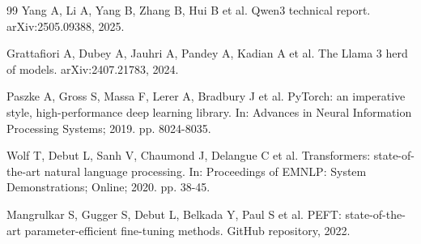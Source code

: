 \documentclass{elektr}
\begin{document}
\begin{thebibliography}{99}
 Yang A, Li A, Yang B, Zhang B, Hui B et al. Qwen3 technical report. arXiv:2505.09388, 2025.

 Grattafiori A, Dubey A, Jauhri A, Pandey A, Kadian A et al. The Llama 3 herd of models. arXiv:2407.21783, 2024.

 Paszke A, Gross S, Massa F, Lerer A, Bradbury J et al. PyTorch: an imperative style, high-performance deep learning library. In: Advances in Neural Information Processing Systems; 2019. pp. 8024-8035.

 Wolf T, Debut L, Sanh V, Chaumond J, Delangue C et al. Transformers: state-of-the-art natural language processing. In: Proceedings of EMNLP: System Demonstrations; Online; 2020. pp. 38-45.

 Mangrulkar S, Gugger S, Debut L, Belkada Y, Paul S et al. PEFT: state-of-the-art parameter-efficient fine-tuning methods. GitHub repository, 2022.

\end{thebibliography}
\end{document}
